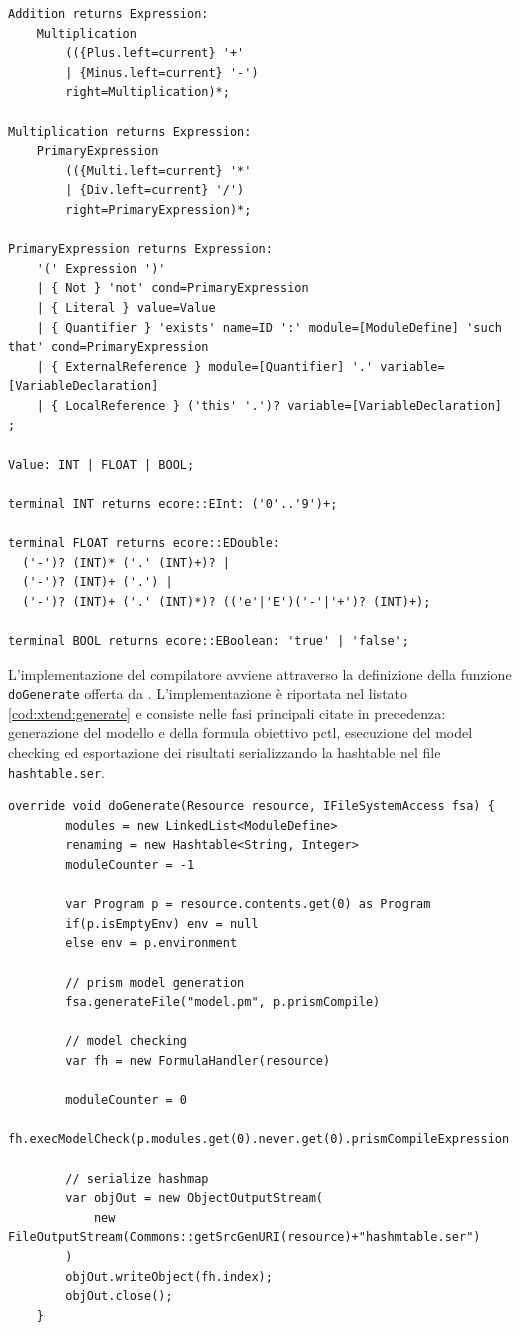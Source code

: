 \begin{lstlisting}[language=xtext,style=eclipse,caption={Sintassi di \ac{lapsa} in \xtext{}},label=code:lapsa:syntax]
Addition returns Expression:
	Multiplication 
		(({Plus.left=current} '+' 
		| {Minus.left=current} '-') 
		right=Multiplication)*;

Multiplication returns Expression:
	PrimaryExpression 
		(({Multi.left=current} '*' 
		| {Div.left=current} '/') 
		right=PrimaryExpression)*;

PrimaryExpression returns Expression:
	'(' Expression ')'
	| { Not } 'not' cond=PrimaryExpression
	| { Literal } value=Value
	| { Quantifier } 'exists' name=ID ':' module=[ModuleDefine] 'such that' cond=PrimaryExpression
	| { ExternalReference } module=[Quantifier] '.' variable=[VariableDeclaration] 
	| { LocalReference } ('this' '.')? variable=[VariableDeclaration]   
;

Value: INT | FLOAT | BOOL;

terminal INT returns ecore::EInt: ('0'..'9')+;

terminal FLOAT returns ecore::EDouble:
  ('-')? (INT)* ('.' (INT)+)? |
  ('-')? (INT)+ ('.') | 
  ('-')? (INT)+ ('.' (INT)*)? (('e'|'E')('-'|'+')? (INT)+);

terminal BOOL returns ecore::EBoolean: 'true' | 'false';
\end{lstlisting}

L'implementazione del compilatore avviene attraverso la definizione della funzione \texttt{doGenerate} offerta da \xtext{}. L'implementazione è riportata nel listato \ref{cod:xtend:generate} e consiste nelle fasi principali citate in precedenza: generazione del modello \prism{} e della formula obiettivo \ac{pctl}, esecuzione del model checking ed esportazione dei risultati serializzando la hashtable nel file \texttt{hashtable.ser}.

\begin{lstlisting}[language=xtend,style=eclipse,caption={Implementazione della funzione di generazione in \xtend{}},label=code:xtend:generate]
	override void doGenerate(Resource resource, IFileSystemAccess fsa) {
		modules = new LinkedList<ModuleDefine>
		renaming = new Hashtable<String, Integer>
		moduleCounter = -1

		var Program p = resource.contents.get(0) as Program
		if(p.isEmptyEnv) env = null
		else env = p.environment

		// prism model generation
		fsa.generateFile("model.pm", p.prismCompile)

		// model checking
		var fh = new FormulaHandler(resource)
		
		moduleCounter = 0
		fh.execModelCheck(p.modules.get(0).never.get(0).prismCompileExpression.toString)
		
		// serialize hashmap
        var objOut = new ObjectOutputStream(
        	new FileOutputStream(Commons::getSrcGenURI(resource)+"hashmtable.ser")
        )
        objOut.writeObject(fh.index);
        objOut.close();
	}
\end{lstlisting}


